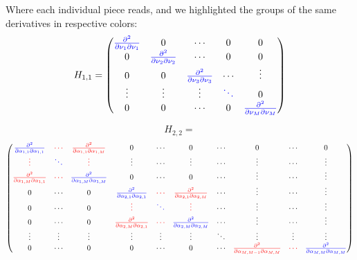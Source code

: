 Where each individual piece reads, and we highlighted the groups of the same derivatives in respective colors:
\begin{equation}
H_{1,1} = 
\begin{pmatrix}
\textcolor{blue}{\frac{\partial^2 } {\partial \nu_1 \partial \nu_1 }} & 0       & \cdots & 0 & 0       \\
0      & \textcolor{blue}{\frac{\partial^2 } {\partial \nu_2 \partial \nu_2 }}
  & \cdots      &  0 & 0       \\
0      & 0       &  \textcolor{blue}{\frac{\partial^2 } {\partial \nu_3 \partial \nu_3 }}
     & \cdots & \vdots  \\
\vdots & \vdots  & \vdots & \textcolor{blue}{\ddots} & 0       \\
0      & 0       & \cdots & 0      & \textcolor{blue}{\frac{\partial^2 } {\partial \nu_M \partial \nu_M }}
\end{pmatrix}
\end{equation}

$$ H_{2,2} = $$
\begin{equation}
\begin{pmatrix}
\textcolor{blue}{\frac{\partial^2 } {\partial \alpha_{1,1} \partial \alpha_{1,1} }          } 
&
 \textcolor{red}{\cdots }
& 
 \textcolor{red}{\frac{\partial^2 }{\partial \alpha_{1,1} \partial \alpha_{1,M} } } 
&
0 & \cdots & 0 & 
\cdots & 0 & 
 \cdots 
&
  0      
\\%
\textcolor{red}{\vdots  }     &  \textcolor{blue}{\ddots }  & \textcolor{red}{\vdots} & \vdots & \cdots & \vdots   & \cdots & \vdots & \cdots & \vdots  
\\%
\textcolor{red}{\frac{\partial^2 }{\partial \alpha_{1,M} \partial \alpha_{1,1} } } & 
\textcolor{red}{\cdots}  & 
\textcolor{blue}{\frac{\partial^2 }{\partial \alpha_{1,M} \partial \alpha_{1,M} }} & 
 0 & \cdots & 0 & \cdots   & \vdots & \cdots & \vdots     
\\%
0  & 
\cdots & 0 & 
\textcolor{blue}{\frac{\partial^2 } {\partial \alpha_{2,1} \partial \alpha_{2,1} }} &
\textcolor{red}{\cdots} & 
\textcolor{red}{\frac{\partial^2 } {\partial \alpha_{2,1} \partial \alpha_{2,M} }}      & 
\cdots & \vdots & \cdots & \vdots
\\%
0  & 
\cdots & 0 & 
\textcolor{red}{\vdots} &
\textcolor{blue}{\ddots }& 
\textcolor{red}{\vdots } & 
\cdots & \vdots & \cdots & \vdots
\\ %
0 &
\cdots & 0 & 
\textcolor{red}{\frac{\partial^2 } {\partial \alpha_{2,M} \partial \alpha_{2,1} }} &
\textcolor{red}{\cdots} & 
\textcolor{blue}{\frac{\partial^2 } {\partial \alpha_{2,M} \partial \alpha_{2,M} }}      & 
\cdots & \vdots & \cdots & \vdots
\\ %
\vdots    &
\vdots & 
\vdots      & 
\vdots & \vdots & \vdots & \ddots &
\vdots & 
\vdots & 
\vdots
\\ %
0      & 
\cdots & 
0      & 
0 & 
\cdots & 
0  & \cdots &
\textcolor{red}{\frac{\partial^2 } {\partial \alpha_{M,M-1} \partial \alpha_{M,M} }} &
\textcolor{red}{\cdots} & 
\textcolor{blue}{\frac{\partial^2 } {\partial \alpha_{M,M} \partial \alpha_{M,M} }}
\end{pmatrix}
\end{equation}




